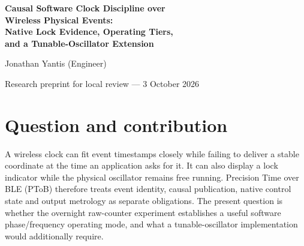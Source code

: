\documentclass[11pt,letterpaper]{article}
\newcommand{\code}[1]{\texttt{\small #1}}
\begin{document}
\thispagestyle{plain}
\begin{center}
{\LARGE\bfseries Causal Software Clock Discipline over\\Wireless Physical Events:\\Native Lock Evidence, Operating Tiers,\\and a Tunable-Oscillator Extension\par}
\vspace{9pt}Jonathan Yantis (Engineer)\par
{\small Research preprint for local review --- 3 October 2026}
\end{center}
\begin{abstract}
This study separates software phase-lock status, causal clock-map error and independently qualified oscillator/output accuracy. An overnight nRF52840 experiment failed to sustain native estimator readiness; its final closure retains 71 captures, including 38 incomplete captures. A subsequent coherence fix and bounded affine-rate/phase-slew servo produced native software lock under an explicit raw-radio profile. Four UI5 cohorts remain separate. Quiet-pair captures gave uncentered earlier-delivered-map RMS 69.136 and 68.106 ns on 1144/1144 and 727/728 retained originals; delayed-join captures gave 66.510 and 72.717 ns on 1106/1106 and 383/383. The final extension retained all 3579 scoreable originals: its first approximately ten minutes gave RMS 231.105 ns, absolute P99 1209 ns and maximum 1413 ns, while its subsequent approximately 23 minutes 52 seconds gave 79.896, 219 and 313 ns. Native lock appeared on 64/128 and 256/281 sampled statuses, without implying uninterrupted lock. The final displayed 84 ns was a floored recent-history statistic, not a run-wide bound. These results motivate an optional, capability-scoped \code{SOFTWARE\_PLL} operating tier. Primary-source review and dimensional analysis define a proposed sampled PI extension for calibrated VCXO/OCXO/DCO or synthesizer actuation, including delay, saturation, phase alignment and holdover. Current boards provide a numerical clock-map actuator only. Fixed path bias, electrical output, quartz/carrier discipline, total uncertainty, energy and field restart behavior remain unqualified.
\end{abstract}

\section{Question and contribution}
A wireless clock can fit event timestamps closely while failing to deliver a stable coordinate at the time an application asks for it. It can also display a lock indicator while the physical oscillator remains free running. Precision Time over BLE (PToB) therefore treats event identity, causal publication, native control state and output metrology as separate obligations. The present question is whether the overnight raw-counter experiment establishes a useful software phase/frequency operating mode, and what a tunable-oscillator implementation would additionally require.
\end{document}
